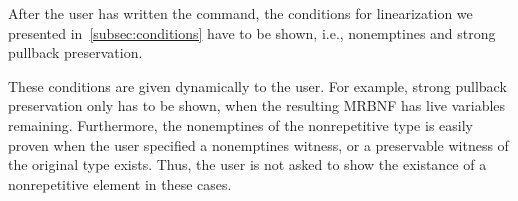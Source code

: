     After the user has written the command, the conditions for linearization we presented in~\autoref{subsec:conditions} have to be shown, i.e., nonemptines and strong pullback preservation. 
    
    These conditions are given dynamically to the user. For example, strong pullback preservation only has to be shown, when the resulting \ac{MRBNF} has live variables remaining. Furthermore, the nonemptines of the nonrepetitive type is easily proven when the user specified a nonemptines witness, or a preservable witness of the original type exists. Thus, the user is not asked to show the existance of a nonrepetitive element in these cases.

    
    

    

  